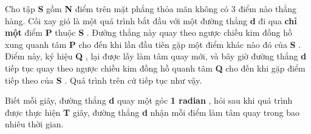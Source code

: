 Cho tập   \textbf{    S   }   gồm   \textbf{    N   }   điểm trên mặt phẳng thỏa mãn không có 3 điểm nào thẳng hàng.   Cối xay gió   là một quá trình bắt đầu với một đường thẳng   \textbf{    d   }   đi qua   \textbf{    chỉ một   }   điểm   \textbf{    P   }   thuộc   \textbf{    S   }   . Đường thẳng này quay theo ngược chiều kim đồng hồ xung quanh tâm   \textbf{    P   }   cho đến khi lần đầu tiên gặp một điểm khác nào đó của   \textbf{    S   }   . Điểm này, ký hiệu   \textbf{    Q   }   , lại được lấy làm tâm quay mới, và bây giờ đường thẳng   \textbf{    d   }   tiếp tục quay theo ngược chiều kim đồng hồ quanh tâm   \textbf{    Q   }   cho đến khi gặp điểm tiếp theo của   \textbf{    S   }   . Quá trình trên cứ tiếp tục như vậy.  

   Biết mỗi giây, đường thẳng   \textbf{    d   }   quay một góc   \textbf{    1 radian   }   , hỏi sau khi quá trình được thực hiện   \textbf{    T   }   giây, đường thẳng   \textbf{    d   }   nhận mỗi điểm làm tâm quay trong bao nhiêu thời gian.